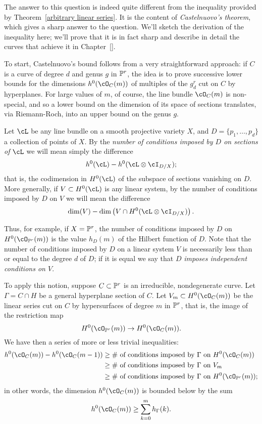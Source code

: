 The answer to this question is indeed quite different from the inequality provided by Theorem~\ref{arbitrary linear series}. It is the content of \emph{Castelnuovo's theorem}, which gives a sharp answer to the question. We'll sketch the derivation of the inequality here; we'll prove that it is in fact sharp and describe in detail  the curves that achieve it in Chapter~\ref{}.

To start, Castelnuovo's bound follows from a very straightforward approach: if $C$ is a curve of degree $d$ and genus $g$ in $\PP^r$, the idea is to prove successive lower bounds for the dimensions $h^0(\cO_C(m))$ of multiples of the $g^r_d$ cut on $C$ by hyperplanes. For large values of $m$, of course, the line bundle $\cO_C(m)$ is non-special, and so a lower bound on the dimension of its space of sections translates, via Riemann-Roch, into an upper bound on the genus $g$.

\begin{definition}
Let $\cL$ be any line bundle on a smooth projective variety $X$, and $D = \{p_1,\dots,p_d\}$ a collection of points of $X$. By the \emph{number of conditions imposed by $D$ on sections of $\cL$} we will mean simply the difference
$$
h^0(\cL) - h^0(\cL \otimes \cI_{D/X});
$$
that is, the codimension in $H^0(\cL)$ of the subspace of sections vanishing on $D$. More generally, if $V \subset H^0(\cL)$ is any linear system, by the number of conditions imposed by $D$ on $V$ we will mean the difference
$$
\dim(V) - \dim \left(V \cap H^0(\cL\otimes \cI_{D/X}) \right).
$$
\end{definition}
Thus, for example, if $X = \PP^r$, the number of conditions imposed by $D$ on $H^0(\cO_{\PP^r}(m))$ is the value $h_D(m)$ of the Hilbert function of $D$.
Note that the number of conditions imposed by $D$ on a linear system $V$ is necessarily less than or equal to the degree $d$ of $D$; if it is equal we say that $D$ \emph{imposes independent conditions on $V$}.

To apply this notion, suppose $C \subset \PP^r$ is an irreducible, nondegenerate curve. Let $\Gamma = C \cap H$ be a general hyperplane section of $C$. Let $V_m \subset H^0(\cO_C(m))$ be the linear series cut on $C$ by hypersurfaces of degree $m$ in $\PP^r$, that is, the image of the restriction map
$$
H^0(\cO_{\PP^r}(m)) \to H^0(\cO_C(m)).
$$
We have then a series of more or less trivial inequalities:
\begin{align*}
h^0(\cO_C(m)) - h^0(\cO_C(m-1)) & \geq \text{\# of conditions imposed by $\Gamma$ on $H^0(\cO_C(m))$} \\
&\geq \text{\# of conditions imposed by $\Gamma$ on $V_m$} \\
&\geq \text{\# of conditions imposed by $\Gamma$ on $H^0(\cO_{\PP^r}(m))$} ;
\end{align*}
in other words, the dimension $h^0(\cO_C(m))$ is bounded below by the sum
$$
h^0(\cO_C(m)) \geq \sum_{k=0}^m h_\Gamma(k).
$$

